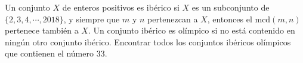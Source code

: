 Un conjunto $X$ de enteros positivos es ibérico si $X$ es un subconjunto de $\{ 2,3,4, \cdots ,2018\}$, y siempre que $m$ y $n$ pertenezcan a $X$, entonces el $\textrm{mcd}(m,n)$ pertenece también a $X$. Un conjunto ibérico es olímpico si no está contenido en ningún otro conjunto ibérico. Encontrar todos los conjuntos ibéricos olímpicos que contienen el número $33$.
